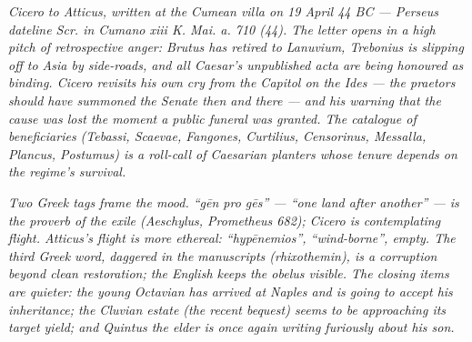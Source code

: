 
\textit{Cicero to Atticus, written at the Cumean villa on 19
April 44 BC --- Perseus dateline \textit{Scr. in Cumano xiii K.
Mai. a. 710 (44)}. The letter opens in a high pitch of
retrospective anger: Brutus has retired to Lanuvium, Trebonius
is slipping off to Asia by side-roads, and all Caesar's
unpublished \textit{acta} are being honoured as binding. Cicero
revisits his own cry from the Capitol on the Ides --- the
praetors should have summoned the Senate then and there --- and
his warning that the cause was lost the moment a public funeral
was granted. The catalogue of beneficiaries (Tebassi, Scaevae,
Fangones, Curtilius, Censorinus, Messalla, Plancus, Postumus)
is a roll-call of Caesarian planters whose tenure depends on
the regime's survival.}

\textit{Two Greek tags frame the mood. ``\textit{g\=en pro
g\=es}'' --- ``one land after another'' --- is the proverb of
the exile (Aeschylus, \textit{Prometheus} 682); Cicero is
contemplating flight. Atticus's flight is more ethereal:
``\textit{hyp\=enemios}'', ``wind-borne'', empty. The third
Greek word, daggered in the manuscripts (\textit{rhixothemin}),
is a corruption beyond clean restoration; the English keeps
the obelus visible. The closing items are quieter: the young
Octavian has arrived at Naples and is going to accept his
inheritance; the Cluvian estate (the recent bequest) seems to
be approaching its target yield; and Quintus the elder is once
again writing furiously about his son.}
